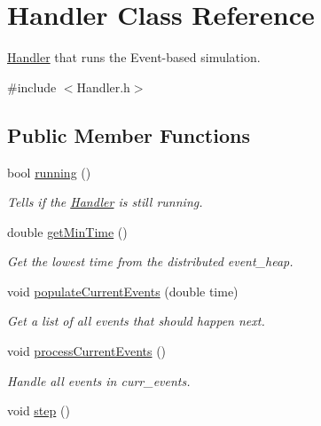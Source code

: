 \hypertarget{classHandler}{\section{\-Handler \-Class \-Reference}
\label{classHandler}
}


\hyperlink{classHandler}{\-Handler} that runs the \-Event-\/based simulation.  




{\ttfamily \#include $<$\-Handler.\-h$>$}

\subsection*{\-Public \-Member \-Functions}
\begin{DoxyCompactItemize}
\item 
bool \hyperlink{classHandler_a4639718d2f590ebd22d0d949a239327d}{running} ()
\begin{DoxyCompactList}\small\item\em \-Tells if the \hyperlink{classHandler}{\-Handler} is still running. \end{DoxyCompactList}\item 
double \hyperlink{classHandler_aa93dcd4a5dc2d1e2f10cec2ebe3a9668}{get\-Min\-Time} ()
\begin{DoxyCompactList}\small\item\em \-Get the lowest time from the distributed event\-\_\-heap. \end{DoxyCompactList}\item 
void \hyperlink{classHandler_abc28c961d70d462106f2f3be46330930}{populate\-Current\-Events} (double time)
\begin{DoxyCompactList}\small\item\em \-Get a list of all events that should happen next. \end{DoxyCompactList}\item 
\hypertarget{classHandler_ad67c5bf3357aba8c6b71fa76c5161d29}{void \hyperlink{classHandler_ad67c5bf3357aba8c6b71fa76c5161d29}{process\-Current\-Events} ()}\label{classHandler_ad67c5bf3357aba8c6b71fa76c5161d29}

\begin{DoxyCompactList}\small\item\em \-Handle all events in curr\-\_\-events. \end{DoxyCompactList}\item 
\hypertarget{classHandler_aa60626b419730f48a1bd5b91c9ade9d7}{void \hyperlink{classHandler_aa60626b419730f48a1bd5b91c9ade9d7}{step} ()}\label{classHandler_aa60626b419730f48a1bd5b91c9ade9d7}


\end{DoxyCompactItemize}
